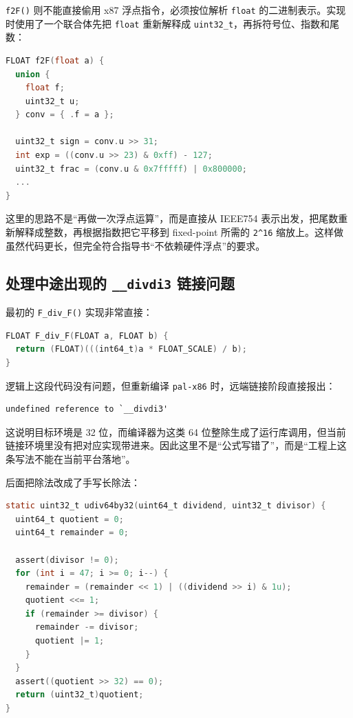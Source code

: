 \documentclass[a4paper]{article}
\begin{document}
\texttt{f2F()} 则不能直接偷用 x87 浮点指令，必须按位解析 \texttt{float} 的二进制表示。实现时使用了一个联合体先把 \texttt{float} 重新解释成 \texttt{uint32\_t}，再拆符号位、指数和尾数：

\begin{lstlisting}[language=C]
FLOAT f2F(float a) {
  union {
    float f;
    uint32_t u;
  } conv = { .f = a };

  uint32_t sign = conv.u >> 31;
  int exp = ((conv.u >> 23) & 0xff) - 127;
  uint32_t frac = (conv.u & 0x7fffff) | 0x800000;
  ...
}
\end{lstlisting}

这里的思路不是“再做一次浮点运算”，而是直接从 IEEE754 表示出发，把尾数重新解释成整数，再根据指数把它平移到 fixed-point 所需的 \texttt{2\^{}16} 缩放上。这样做虽然代码更长，但完全符合指导书“不依赖硬件浮点”的要求。

\subsection{处理中途出现的 \texttt{\_\_divdi3} 链接问题}
最初的 \texttt{F\_div\_F()} 实现非常直接：

\begin{lstlisting}[language=C]
FLOAT F_div_F(FLOAT a, FLOAT b) {
  return (FLOAT)(((int64_t)a * FLOAT_SCALE) / b);
}
\end{lstlisting}

逻辑上这段代码没有问题，但重新编译 \texttt{pal-x86} 时，远端链接阶段直接报出：

\begin{lstlisting}
undefined reference to `__divdi3'
\end{lstlisting}

这说明目标环境是 32 位，而编译器为这类 64 位整除生成了运行库调用，但当前链接环境里没有把对应实现带进来。因此这里不是“公式写错了”，而是“工程上这条写法不能在当前平台落地”。

后面把除法改成了手写长除法：

\begin{lstlisting}[language=C]
static uint32_t udiv64by32(uint64_t dividend, uint32_t divisor) {
  uint64_t quotient = 0;
  uint64_t remainder = 0;

  assert(divisor != 0);
  for (int i = 47; i >= 0; i--) {
    remainder = (remainder << 1) | ((dividend >> i) & 1u);
    quotient <<= 1;
    if (remainder >= divisor) {
      remainder -= divisor;
      quotient |= 1;
    }
  }
  assert((quotient >> 32) == 0);
  return (uint32_t)quotient;
}
\end{lstlisting}
\end{document}
